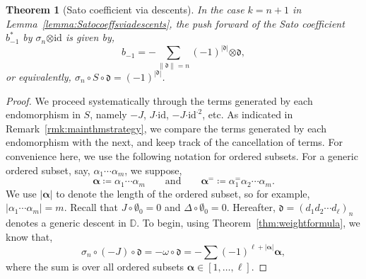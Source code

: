 \documentclass[5p,twocolumn]{elsarticle}
\newcommand*{\id}{{\mathrm{id}}}
\newcommand*{\df}{\mathfrak d}
\newcommand*{\cendot}{\boldsymbol{\cdot}}
\newcommand*{\botimes}{\boldsymbol{\otimes}}
\newcommand*{\balpha}{\boldsymbol{\alpha}}
\newtheorem{theorem}{Theorem}
\begin{document}
%
\begin{theorem}[Sato coefficient via descents]\label{thm:Satocoeffsdescents}
  In the case $k=n+1$ in Lemma~\ref{lemma:Satocoeffsviadescents}, the push forward of the Sato coefficient $b^\ast_{-1}$ by $\sigma_n\botimes\id$ is given by,
  \begin{equation}\label{eq:finalSatocoeff}
        b_{-1}=-\sum_{\|\df\|=n}(-1)^{|\df|}\botimes\df,
  \end{equation}
  or equivalently, $\sigma_n\circ S\circ\df=(-1)^{|\df|}$.
\end{theorem}
%
\begin{proof}
We proceed systematically through the terms generated by each endomorphism in $S$, namely $-J$, $J\cendot\id$, $-J\cendot\id^{\cendot2}$, etc. 
As indicated in Remark~\ref{rmk:mainthmstrategy}, we compare the terms generated by each endomorphism with the next, and keep track of the cancellation of terms.
For convenience here, we use the following notation for ordered subsets.
For a generic ordered subset, say, $\alpha_1\cdots\alpha_m$, we suppose,
\begin{equation*}
\balpha\coloneqq\alpha_1\cdots\alpha_m\qquad\text{and}\qquad\balpha^=\coloneqq\alpha_1^=\alpha_2\cdots\alpha_m.
\end{equation*}
We use $|\balpha|$ to denote the length of the ordered subset, so for example, $|\alpha_1\cdots\alpha_m|=m$.
Recall that $J\circ\emptyset_0=0$ and $\Delta\circ\emptyset_0=0$.
Hereafter, $\df=(d_1d_2\cdots d_\ell)_n$ denotes a generic descent in $\mathbb D$.
To begin, using Theorem~\ref{thm:weightformula}, we know that,
\begin{equation}\label{eq:mainstep1}
  \sigma_n\circ(-J)\circ\df=-\omega\circ\df=-\sum(-1)^{\ell+|\balpha|}\balpha,
\end{equation}
where the sum is over all ordered subsets $\balpha\in[1,\ldots,\ell]$.


\end{proof}
\end{document}
